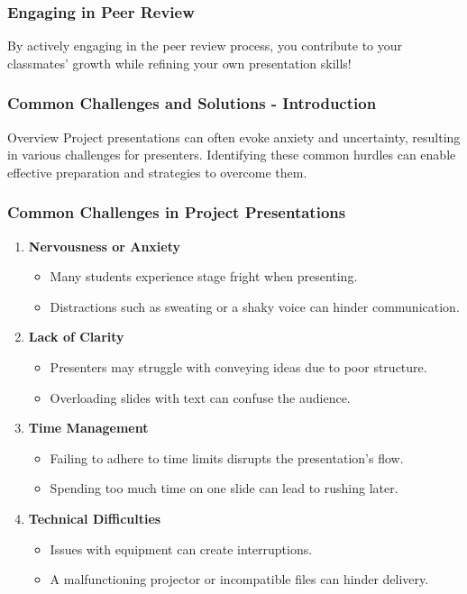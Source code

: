 \documentclass{beamer}
\begin{document}
\begin{frame}[fragile]
    \frametitle{Engaging in Peer Review}
    By actively engaging in the peer review process, you contribute to your classmates' growth while refining your own presentation skills!
\end{frame}

\begin{frame}[fragile]
    \frametitle{Common Challenges and Solutions - Introduction}
    \begin{block}{Overview}
        Project presentations can often evoke anxiety and uncertainty, resulting in various challenges for presenters. Identifying these common hurdles can enable effective preparation and strategies to overcome them.
    \end{block}
\end{frame}

\begin{frame}[fragile]
    \frametitle{Common Challenges in Project Presentations}
    \begin{enumerate}
        \item \textbf{Nervousness or Anxiety}
            \begin{itemize}
                \item Many students experience stage fright when presenting.
                \item Distractions such as sweating or a shaky voice can hinder communication.
            \end{itemize}
        
        \item \textbf{Lack of Clarity}
            \begin{itemize}
                \item Presenters may struggle with conveying ideas due to poor structure.
                \item Overloading slides with text can confuse the audience.
            \end{itemize}
        
        \item \textbf{Time Management}
            \begin{itemize}
                \item Failing to adhere to time limits disrupts the presentation's flow.
                \item Spending too much time on one slide can lead to rushing later.
            \end{itemize}
        
        \item \textbf{Technical Difficulties}
            \begin{itemize}
                \item Issues with equipment can create interruptions.
                \item A malfunctioning projector or incompatible files can hinder delivery.
            \end{itemize}
    \end{enumerate}
\end{frame}
\end{document}
